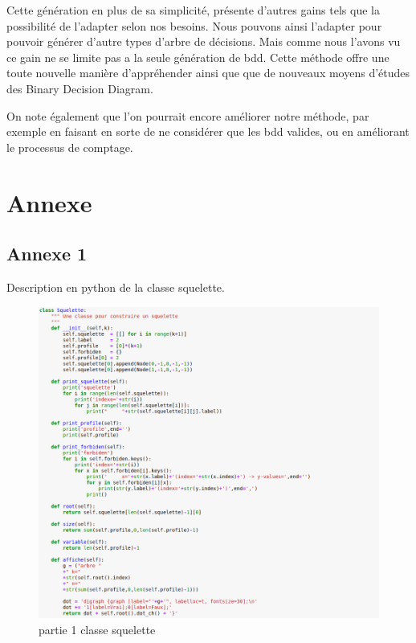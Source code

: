 \documentclass[french]{article}
\begin{document}
Cette génération en plus de sa simplicité, présente d'autres gains tels que la possibilité de l'adapter selon nos besoins. Nous pouvons ainsi l'adapter pour pouvoir générer d'autre types d'arbre de décisions.
Mais comme nous l'avons vu ce gain ne se limite pas a la seule génération de bdd. Cette méthode offre une toute nouvelle manière d'appréhender ainsi que que de nouveaux moyens d'études des Binary Decision Diagram.

On note également que l'on pourrait encore améliorer notre méthode, par exemple en faisant en sorte de ne considérer que les bdd valides, ou en améliorant le processus de comptage. 
\newpage
\section{Annexe}
\subsection{Annexe 1}
\label{Annexe_1}
Description en python de la classe squelette. 

\begin{figure}[H]
    \centering
    \includegraphics[scale=0.4]{part1_squelette.png}
    \caption{partie 1 classe squelette}
    \label{fig:squelette1}
\end{figure}
\end{document}
